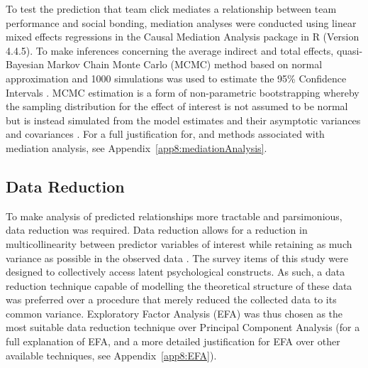 \begin{CJK}{UTF8}{gbsn}
To test the prediction that team click mediates a relationship between team performance and social bonding, mediation analyses were conducted using linear mixed effects regressions in the Causal Mediation Analysis package in R (Version 4.4.5).  To make inferences concerning the average indirect and total effects, quasi-Bayesian Markov Chain Monte Carlo (MCMC) method based on normal approximation and 1000 simulations was used to estimate the 95\% Confidence Intervals \citep{Tofighi2016a,Imai2010}. MCMC estimation is a form of non-parametric bootstrapping whereby the sampling distribution for the effect of interest is not assumed to be normal but is instead simulated from the model estimates and their asymptotic variances and covariances \citep{Preacher2008}.  For a full justification for, and methods associated with mediation analysis, see Appendix~\ref{app8:mediationAnalysis}.

\subsection{Data Reduction\label{Ch5:dataReduction}}
 To make analysis of predicted relationships more tractable and parsimonious, data reduction was required.  Data reduction allows for a reduction in multicollinearity between predictor variables of interest while retaining as much variance as possible in the observed data \citep{Yong2013}.  The survey items of this study were designed to collectively access latent psychological constructs.  As such, a data reduction technique capable of modelling the theoretical structure of these data was preferred over a procedure that merely reduced the collected data to its common variance.  Exploratory Factor Analysis (EFA) was thus chosen as the most suitable data reduction technique over Principal Component Analysis (for a full explanation of EFA, and a more detailed justification for EFA over other available techniques, see Appendix~\ref{app8:EFA}).


\end{CJK}
